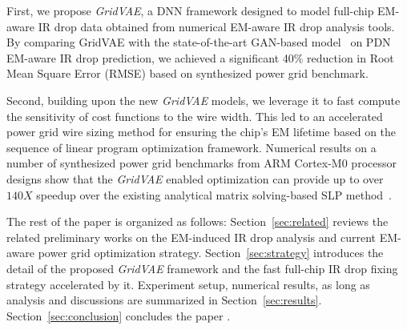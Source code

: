 \begin{itemlist}

\item  First, we propose  {\it GridVAE}, a DNN framework designed to model full-chip EM-aware IR drop data obtained from numerical EM-aware IR drop analysis tools. By comparing GridVAE with the state-of-the-art GAN-based model~\cite{ZhouJin:ICCAD'20} on PDN EM-aware IR drop prediction, we achieved a significant 40\% reduction in Root Mean Square Error (RMSE) based on synthesized power grid benchmark.

\item Second, building upon the new {\it GridVAE} models, we leverage it to fast compute the sensitivity of cost functions to the wire width. This led to an accelerated power grid wire sizing method for ensuring the chip's EM lifetime based on the sequence of linear program optimization framework. Numerical results on a number of synthesized power grid benchmarks from ARM Cortex-M0 processor designs show that the {\it GridVAE} enabled optimization can provide up to over $140X$ speedup over the existing analytical matrix solving-based SLP method~\cite{Sukharev:2019pg}.
 
\end{itemlist}

The rest of the paper is organized as follows: Section~\ref{sec:related} reviews the related preliminary works on the EM-induced IR drop analysis and current EM-aware power grid optimization strategy. Section~\ref{sec:strategy} introduces the detail of the proposed {\it GridVAE} framework and the fast full-chip IR drop fixing strategy accelerated by it. Experiment setup, numerical results, as long as analysis and discussions are summarized in Section~\ref{sec:results}.  Section~\ref{sec:conclusion} concludes the paper .